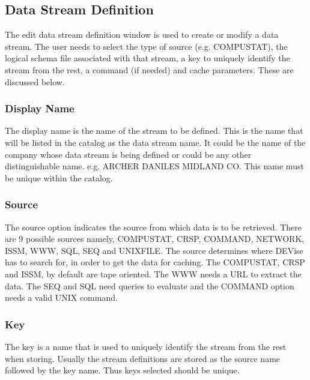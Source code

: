 \subsection{Data Stream Definition}

The edit data stream definition window is used to create or modify a
data stream. The user needs to select the type of source
(e.g. COMPUSTAT), the logical schema file associated with that
stream, a key to uniquely identify the stream from the rest, a command
(if needed) and cache parameters. These are discussed below.

\subsubsection{Display Name}

The display name is the name of the stream to be defined. This is the
name that will be listed in the catalog as the data stream name. It
could be the name of the company whose data stream is being defined or
could be any other distinguishable name.  e.g. ARCHER DANILES MIDLAND
CO. This name must be unique within the catalog.

\subsubsection{Source}

The source option indicates the source from which data is to be
retrieved. There are 9 possible sources namely, COMPUSTAT, CRSP,
COMMAND, NETWORK, ISSM, WWW, SQL, SEQ and UNIXFILE. The source
determines where DEVise has to search for, in order to get the data
for caching. The COMPUSTAT, CRSP and ISSM, by default are tape
oriented. The WWW needs a URL to extract the data. The SEQ and SQL
need queries to evaluate and the COMMAND option needs a valid UNIX
command.

\subsubsection{Key}

The key is a name that is used to uniquely identify the stream from
the rest when storing. Usually the stream definitions are stored as
the source name followed by the key name. Thus keys selected should be
unique.

